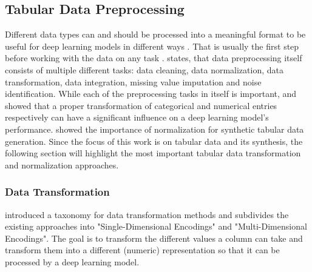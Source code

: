 \subsection{Tabular Data Preprocessing}
\label{sec:preprocessing}

Different data types can and should be processed into a meaningful format to be useful for deep learning models in different ways \cite{fan2020RelationalDataSynthesisa, lederrey2022DATGANIntegratingExperta}.
That is usually the first step before working with the data on any task \cite{izonin2022TwoStepDataNormalization}.
\cite{garcia2016BigDataPreprocessing} states, that data preprocessing itself consists of multiple different tasks: data cleaning, data normalization, data transformation, data integration, missing value imputation and noise identification.
While each of the preprocessing tasks in itself is important, 
\cite{fitkov-norris2012EvaluatingImpactCategorical} and \cite{gorishniy2022EmbeddingsNumericalFeatures} showed that a proper transformation of categorical and numerical entries respectively can have a significant influence on a deep learning model's performance.
\cite{xu2019ModelingTabularData} showed the importance of normalization for synthetic tabular data generation.
Since the focus of this work is on tabular data and its synthesis, the following section will highlight the most important tabular data transformation and normalization approaches.

\subsubsection{Data Transformation}
\label{sec:dataTransformation}

\textcite[p. 5]{borisov2022DeepNeuralNetworks} introduced a taxonomy for data transformation methods and subdivides the existing approaches into "Single-Dimensional Encodings" and "Multi-Dimensional Encodings".
The goal is to transform the different values a column can take and transform them into a different (numeric) representation so that it can be processed by a deep learning model.

